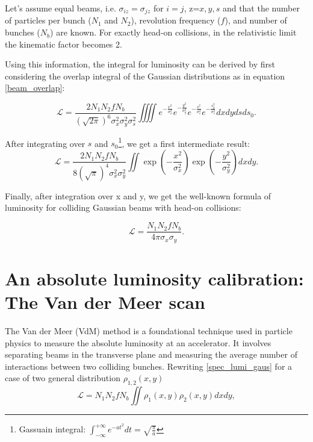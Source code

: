 Let's assume equal beams, i.e.  $\sigma_{iz} = \sigma_{jz}$ for $i=j$, z=$x,y,s$ and that the number of particles per bunch (\( N_1 \) and \( N_2 \)), revolution frequency (\( f \)), and number of bunches (\( N_b \)) are known. For exactly head-on collisions, in the relativistic limit the kinematic factor becomes 2.

Using this information, the integral for luminosity can be derived by first considering the overlap integral of the Gaussian distributions as in equation \eqref{beam_overlap}:

\begin{equation}
\mathcal{L} = \frac{2  N_1 N_2 f N_b}{(\sqrt{2\pi})^6 \sigma_x^2\sigma_y^2\sigma_s^2}\iiiint e^{-\frac{x^2}{ \sigma_x^2}} e^{-\frac{y^2}{\sigma_y^2}} e^{-\frac{s^2}{\sigma_s^2}}e^{-\frac{s_0^2}{\sigma_s^2}}dxdydsds_0.
\end{equation}

After integrating over $s$ and $s_0$\footnote{Gassuain integral: $\int_{-\infty}^{+\infty}e^{-at^2}dt = \sqrt{\tfrac{\pi}{a}}$}, we get a first intermediate result:
\begin{equation}
    \mathcal{L} = \frac{2  N_1 N_2 f N_b}{8(\sqrt{\pi})^4 \sigma_x^2\sigma_y^2}\iint \exp\left(-\frac{x^2}{\sigma_x^2}\right) \exp\left(-\frac{y^2}{\sigma_y^2}\right) dxdy .\label{spec_lumi_gaus}
\end{equation}

Finally, after integration over x and y, we get the well-known formula of luminosity for colliding Gaussian beams with head-on collisions:

\begin{equation}
\mathcal{L} = \frac{N_1  N_2  f N_b}{4 \pi  \sigma_x \sigma_y}.
\end{equation}




\section{An absolute luminosity calibration: The Van der Meer scan}
The Van der Meer (VdM) method is a foundational technique used in particle physics to measure the absolute luminosity at an accelerator. It involves separating beams in the transverse plane and measuring the average number of interactions between two colliding bunches. 
Rewriting \ref{spec_lumi_gaus} for a case of two general distribution $\rho_{1,2} (x,y)$
\begin{equation}
    \mathcal{L} = N_1 N_2 f N_b\iint \rho_1(x,y) \rho_2(x,y) dxdy,\label{generic_lumi}
\end{equation}

